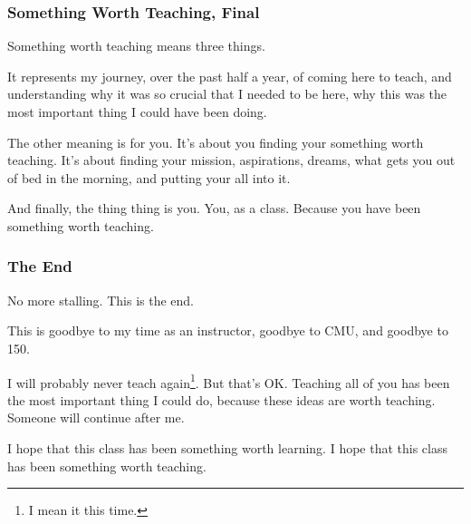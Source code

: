\documentclass[aspectratio=169, handout]{beamer}
\begin{document}
\begin{frame}[fragile]
  \frametitle{Something Worth Teaching, Final}

  Something worth teaching means three things.

  \pause
  \vspace{\fill}

  It represents my journey, over the past half a year, of coming here to teach,
  and understanding why it was so crucial that I needed to be here, why this was
  the most important thing I could have been doing.

  \pause
  \vspace{\fill}

  The other meaning is for you. It's about you finding your something worth teaching.
  It's about finding your mission, aspirations, dreams, what gets you out of bed
  in the morning, and putting your all into it.

  \pause
  \vspace{\fill}

  And finally, the thing thing is you. You, as a class. Because you have been
  something worth teaching.
\end{frame}

\begin{frame}[fragile]
  \frametitle{The End}

  No more stalling. This is the end.

  \pause
  \vspace{\fill}

  This is goodbye to my time as an instructor, goodbye to CMU, and goodbye to 150.

  \pause
  \vspace{\fill}

  I will probably never teach again\footnote{I mean it this time.}. But that's OK. Teaching all of you has been
  the most important thing I could do, because these ideas are worth teaching.
  Someone will continue after me.

  \pause
  \vspace{\fill}

  I hope that this class has been something worth learning. I hope that this
  class has been something worth teaching.
\end{frame}
\end{document}
